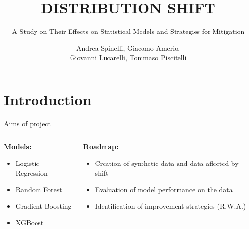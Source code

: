 \documentclass[11pt]{beamer}
\begin{document}
\title{DISTRIBUTION SHIFT}
\subtitle{A Study on Their Effects on Statistical Models and Strategies for Mitigation}
\date{}
\author{Andrea Spinelli, Giacomo Amerio,\\Giovanni Lucarelli, Tommaso Piscitelli}



\section{Introduction}


\begin{frame}{Aims of project}
	\begin{columns} %
		\begin{column}{0.5\textwidth}
			\textbf{Models:}
			\begin{tcolorbox}[colframe=blue!50!black, colback=blue!5, coltitle=black, sharp corners]
				\begin{itemize}
					\item Logistic Regression
					\item Random Forest
					\item Gradient Boosting
					\item XGBoost
				\end{itemize}
			\end{tcolorbox}
		\end{column}
		
		\vspace{0.5cm}
		\begin{column}{0.5\textwidth}
			\textbf{Roadmap:}
			\begin{itemize}
				\item Creation of synthetic data and data affected by shift
				\item Evaluation of model performance on the data
				\item Identification of improvement strategies (R.W.A.)
			\end{itemize}
		\end{column}
	\end{columns} %
\end{frame}
\end{document}
